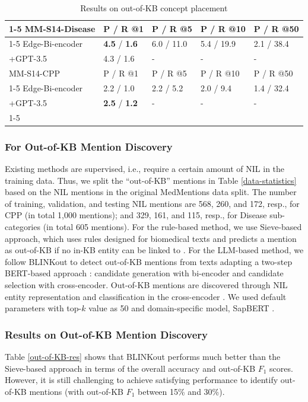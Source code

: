 \documentclass[sigconf]{acmart}
\begin{document}
	\begin{table}
		\small
		\caption{Results on out-of-KB concept placement}\label{insertion-res}
		\begin{tabular}{l|l|l|l|l}
			\cline{1-5}
			MM-S14-Disease  & P / R @1 & P / R @5 & P / R @10 & P / R @50\\
			\cline{1-5}
			Edge-Bi-encoder &  \textbf{4.5} / \textbf{1.6}         & 6.0 / 11.0         & 5.4 / 19.9 & 2.1 / 38.4  \\
			+GPT-3.5    & 4.3 / 1.6          &    -       &   -      &  -  \\
			\hline\hline
			MM-S14-CPP      & P / R @1 & P / R @5 & P / R @10 & P / R @50 \\
			\cline{1-5}
			Edge-Bi-encoder &  2.2 / 1.0 & 2.2 / 5.2 & 2.0 / 9.4 & 1.4 / 32.4\\ 
			+GPT-3.5        & \textbf{2.5} / \textbf{1.2}          &   -        &   -   &   -   \\ 
			\cline{1-5}
		\end{tabular}
	\end{table}
	
	\subsubsection*{For Out-of-KB Mention Discovery} Existing methods are supervised, i.e., require a certain amount of NIL in the training data. Thus, we split the ``out-of-KB'' mentions in Table \ref{data-statistics} based on the NIL mentions in the original MedMentions data split. The number of training, validation, and testing NIL mentions are 568, 260, and 172, resp., for CPP (in total 1,000 mentions); and 329, 161, and 115, resp., for Disease sub-categories  (in total 605 mentions). For the rule-based method, we use Sieve-based approach, which uses rules designed for biomedical texts and predicts a mention as out-of-KB if no in-KB entity can be linked to \cite{dsouza-ng-2015-sieve-based}. For the LLM-based method, we follow BLINKout \cite{dong2023NIL} to detect out-of-KB mentions from texts adapting a two-step BERT-based approach \cite{wu2020blink}: candidate generation with bi-encoder and candidate selection with cross-encoder. Out-of-KB mentions are discovered through NIL entity representation and classification in the cross-encoder \cite{dong2023NIL}. We used default parameters with top-$k$ value as 50 and domain-specific model, SapBERT \cite{liu2021sap}.
	
	\subsubsection*{Results on Out-of-KB Mention Discovery} Table \ref{out-of-KB-res} shows that BLINKout performs much better than the Sieve-based approach in terms of the overall accuracy and out-of-KB $F_1$ scores. However, it is still challenging to achieve satisfying performance to identify out-of-KB mentions (with out-of-KB $F_{1}$ between 15\% and 30\%).
	
\end{document}
